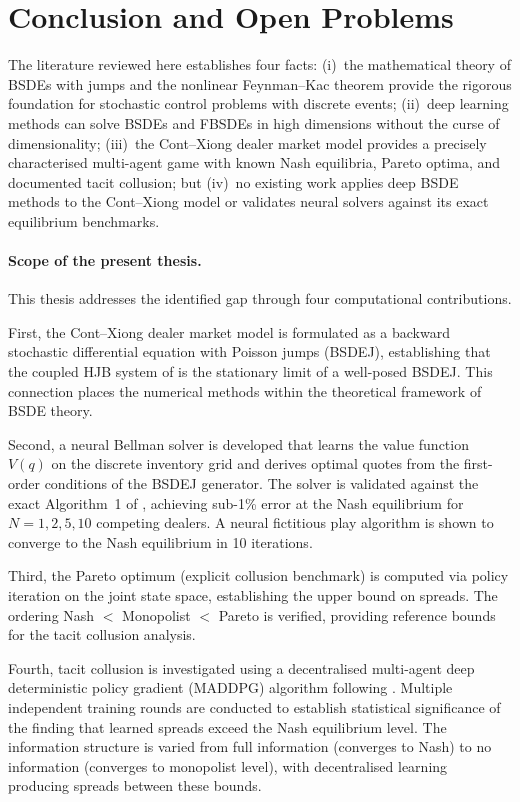 \section{Conclusion and Open Problems}\label{sec:lit-conclusion-revised}

The literature reviewed here establishes four facts:
(i)~the mathematical theory of BSDEs with jumps and the
nonlinear Feynman--Kac theorem provide the rigorous foundation for
stochastic control problems with discrete events;
(ii)~deep learning methods can solve BSDEs and FBSDEs in high
dimensions without the curse of dimensionality;
(iii)~the Cont--Xiong dealer market model provides a precisely
characterised multi-agent game with known Nash equilibria, Pareto
optima, and documented tacit collusion;
but (iv)~no existing work applies deep BSDE methods to the
Cont--Xiong model or validates neural solvers against its exact
equilibrium benchmarks.

\paragraph{Scope of the present thesis.}
This thesis addresses the identified gap through four computational
contributions.

First, the Cont--Xiong dealer market model is formulated as a
backward stochastic differential equation with Poisson jumps
(BSDEJ), establishing that the coupled HJB system of
\citet{cont2024} is the stationary limit of a well-posed BSDEJ.
This connection places the numerical methods within the theoretical
framework of BSDE theory.

Second, a neural Bellman solver is developed that learns the value
function $V(q)$ on the discrete inventory grid and derives optimal
quotes from the first-order conditions of the BSDEJ generator.
The solver is validated against the exact Algorithm~1 of
\citet{cont2024}, achieving sub-1\% error at the Nash equilibrium
for $N = 1, 2, 5, 10$ competing dealers.  A neural fictitious play
algorithm is shown to converge to the Nash equilibrium in 10
iterations.

Third, the Pareto optimum (explicit collusion benchmark) is
computed via policy iteration on the joint state space, establishing
the upper bound on spreads.  The ordering Nash $<$ Monopolist $<$
Pareto is verified, providing reference bounds for the tacit
collusion analysis.

Fourth, tacit collusion is investigated using a decentralised
multi-agent deep deterministic policy gradient (MADDPG) algorithm
following \citet{cont2024}.  Multiple independent training rounds
are conducted to establish statistical significance of the finding
that learned spreads exceed the Nash equilibrium level.  The
information structure is varied from full information (converges to
Nash) to no information (converges to monopolist level), with
decentralised learning producing spreads between these bounds.

